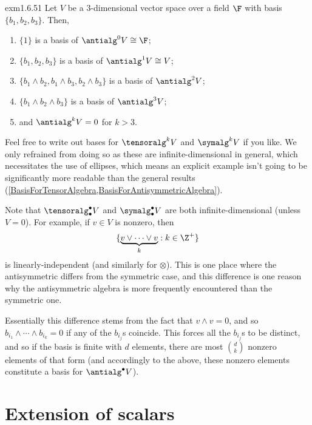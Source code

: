 \begin{exm}{}{exm1.6.51}
	Let $V$ be a $3$-dimensional vector space over a field $\F$ with basis $\{ b_1,b_2,b_3\}$.  Then,
	\begin{enumerate}
		\item $\{ 1\}$ is a basis of $\antialg ^0V\cong \F$;
		\item $\{ b_1,b_2,b_3\}$ is a basis of $\antialg ^1V\cong V$;
		\item $\{ b_1\wedge b_2,b_1\wedge b_3,b_2\wedge b_3\}$ is a basis of $\antialg ^2V$;
		\item $\{ b_1\wedge b_2\wedge b_3\}$ is a basis of $\antialg ^3V$;
		\item and $\antialg ^kV=0$ for $k>3$.
	\end{enumerate}
	\begin{rmk}
		Feel free to write out bases for $\tensoralg ^kV$ and $\symalg ^kV$ if you like.  We only refrained from doing so as these are infinite-dimensional in general, which necessitates the use of ellipses, which means an explicit example isn't going to be significantly more readable than the general results (\cref{BasisForTensorAlgebra,BasisForAntisymmetricAlgebra}).
	\end{rmk}
\end{exm}
Note that $\tensoralg _{\bullet}^{\bullet}V$ and $\symalg _{\bullet}^{\bullet}V$ are both infinite-dimensional (unless $V=0$).  For example, if $v\in V$ is nonzero, then
\begin{equation}
	\{ \underbrace{v\vee \cdots \vee v}_k:k\in \Z ^+\}
\end{equation}
is linearly-independent (and similarly for $\otimes$).  This is one place where the antisymmetric differs from the symmetric case, and this difference is one reason why the antisymmetric algebra is more frequently encountered than the symmetric one.

Essentially this difference stems from the fact that $v\wedge v=0$, and so $b_{i_1}\wedge \cdots \wedge b_{i_k}=0$ if any of the $b_{i_j}$s coincide.  This forces all the $b_{i_j}$s to be distinct, and so if the basis is finite with $d$ elements, there are most $\binom{d}{k}$ nonzero elements of that form (and accordingly to the above, these nonzero elements constitute a basis for $\antialg ^{\bullet}V$). 

\section{Extension of scalars}\label{sctExtensionOfScalars}

